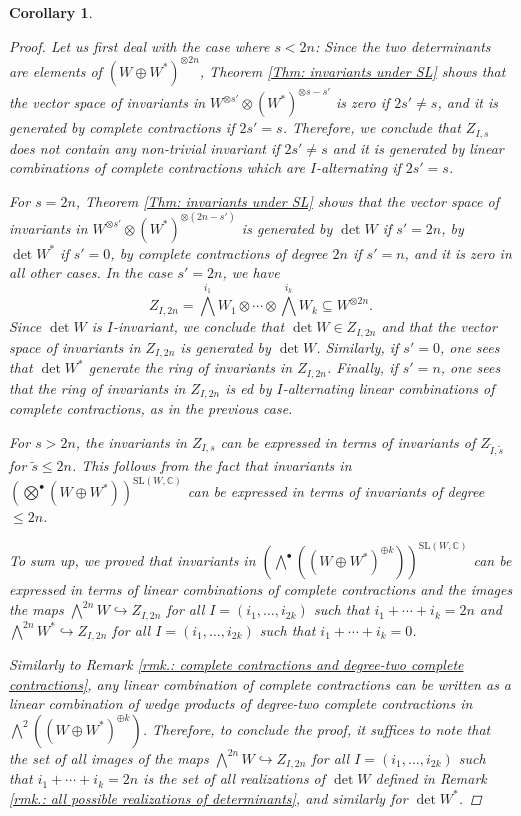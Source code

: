 \documentclass[11pt,twoside,a4paper]{amsart}
\newcommand{\0}{\mathscr{O}}
\newcommand{\C}{\mathbb{C}}
\theoremstyle{plain}
\newtheorem{cor}[thm]{Corollary}
\theoremstyle{definition}
\theoremstyle{remark}
\begin{document}
\begin{cor}
\begin{proof}
\smallskip

Let us first deal with the case where $s<2n$: Since the two determinants are elements of $(W\oplus W^*)^{\otimes 2n}$, Theorem \ref{Thm: invariants under SL} shows that the vector space of invariants in $W^{\otimes s'}\otimes (W^*)^{\otimes s-s'}$ 
is zero if $2s'\not =s$, and it is generated by complete contractions if $2s'=s$.
Therefore, we conclude that $Z_{I,s}$ does not contain any non-trivial invariant if $2s'\not= s$ and it is generated by linear combinations of complete contractions which are $I$-alternating if $2s'=s$.

\smallskip

For $s=2n$, Theorem \ref{Thm: invariants under SL} shows that the vector space of invariants in $W^{\otimes s'}\otimes(W^*)^{\otimes (2n-s')}$ is generated by $\det W$ if $s'=2n$, by $\det W^*$ if $s'=0$, by complete contractions of degree $2n$ if $s'=n$, and it is zero in all other cases. 
In the case $s'=2n$, we have
\[
\textstyle Z_{I,2n}=\bigwedge^{i_1}W_1\otimes\cdots\otimes \bigwedge^{i_k}W_k\subseteq W^{\otimes 2n}.
\]
Since $\det W$ is $I$-invariant, we conclude that $\det W\in Z_{I,2n}$ and that the vector space of invariants in $Z_{I,2n}$ is generated by $\det W$. Similarly, if $s'=0$, one sees that $\det W^*$ generate the ring of invariants in $Z_{I,2n}$. Finally, if $s'=n$, one sees that the ring of invariants in $Z_{I,2n}$ is
ed by $I$-alternating linear combinations of complete contractions, as in the previous case.

\smallskip

For $s>2n$, the invariants in $Z_{I,s}$ can be expressed in terms of invariants of $Z_{\tilde{I},\tilde{s}}$ for $\tilde{s}\leq 2n$. This follows from the fact that invariants in  $\left(\bigotimes^{\bullet}( W\oplus W^*)\right)^{\mathrm{SL}(W,\C)}$ can be expressed in terms of invariants of degree $\leq 2n$.

\smallskip

To sum up, we proved that invariants in $\textstyle\left(\bigwedge^{\bullet}((W\oplus W^*)^{\oplus k})\right)^{\mathrm{SL}(W,\C)}$
can be expressed in terms of linear combinations of complete contractions and the images the maps $\bigwedge^{2n} W\hookrightarrow Z_{I,2n}$ for all $I=(i_1,\ldots,i_{2k})$ such that $i_1+\cdots+i_k=2n$ and $\bigwedge^{2n} W^*\hookrightarrow Z_{I,2n}$ for all $I=(i_1,\ldots,i_{2k})$ such that $i_1+\cdots+i_k=0$.

\smallskip

Similarly to Remark \ref{rmk.: complete contractions and degree-two complete contractions}, any linear combination of complete contractions can be written as a linear combination of wedge products of degree-two complete contractions in $\bigwedge^2\left( (W\oplus W^*)^{\oplus k}\right)$.
Therefore, to conclude the proof, it suffices to note that the set of all images of the maps $\bigwedge^{2n} W\hookrightarrow Z_{I,2n}$ for all $I=(i_1,\ldots,i_{2k})$ such that $i_1+\cdots+i_k=2n$ is the set of all realizations of $\det W$ defined
in Remark \ref{rmk.: all possible realizations of determinants}, and similarly for $\det W^*$.
\end{proof}
\end{cor}
\end{document}
